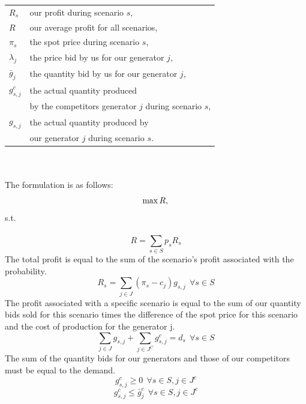 \documentclass[letterpaper]{article}
\begin{document}
\begin{tabular}{ll}
$R_s$ & our profit during scenario $s$, \\
$R$ & our average profit for all scenarios, \\
$\pi_s$ & the spot price during scenario $s$, \\
$\lambda_{j}$ & the price bid by us for our generator $j$, \\
$\bar{g}_{j}$ & the quantity bid by us for our generator $j$, \\
$g^c_{s,j}$ & the actual quantity produced \\
  & by the competitors generator $j$ during scenario $s$, \\
$g_{s,j}$ & the actual quantity produced by \\
 & our generator $j$ during scenario $s$.
\end{tabular} \\ \\
The formulation is as follows:
\begin{equation}
\max R, \\
\end{equation}
s.t. \\ \\
\begin{equation}
R = \sum_{s \in S} p_s R_s
\end{equation}
The total profit is equal to the sum of the scenario's profit associated with the probability.\\
\begin{equation}
R_s = \sum_{j \in J} \left(\pi_s - c_j\right) g_{s,j} \ \ \forall s \in S
\end{equation}
The profit associated with a specific scenario is equal to the sum of our quantity bids sold for this scenario times the difference of the spot price for this scenario and the cost of production for the generator j.\\
\begin{equation}
\sum_{j \in J} g_{s,j} + \sum_{j \in J^C} g^c_{s,j} = d_s \ \ \forall s \in S
\end{equation}
The sum of the quantity bids for our generators and those of our competitors must be equal to the demand.\\
\begin{equation}
g^c_{s,j} \ge 0 \ \  \forall s \in S, j \in J^c
\end{equation}
\begin{equation}
g^c_{s,j} \le \bar{g}^{c}_j \ \  \forall s \in S, j \in J^c
\end{equation}
\end{document}
